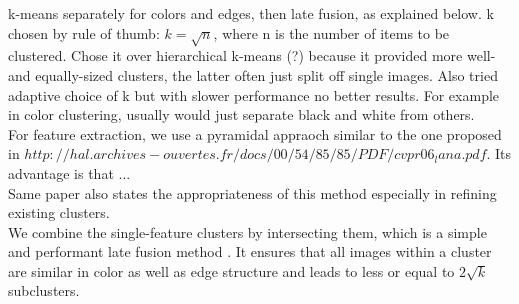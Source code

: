 k-means separately for colors and edges, then late fusion, as explained below. k chosen by rule of thumb: $ k = \sqrt{n} $, where n is the number of items to be clustered. Chose it over hierarchical k-means (?) because it provided more well- and equally-sized clusters, the latter often just split off single images.
Also tried adaptive choice of k but with slower performance no better results. For example in color clustering, usually would just separate black and white from others.\\
For feature extraction, we use a pyramidal appraoch similar to the one proposed in  $http://hal.archives-ouvertes.fr/docs/00/54/85/85/PDF/cvpr06_lana.pdf$. Its advantage is that ... \\
Same paper also states the appropriateness of this method especially in refining existing clusters.\\
We combine the single-feature clusters by intersecting them, which is a simple and performant late fusion method . It ensures that all images within a cluster are similar in color as well as edge structure and leads to less or equal to $ 2\sqrt{k} $ subclusters.
